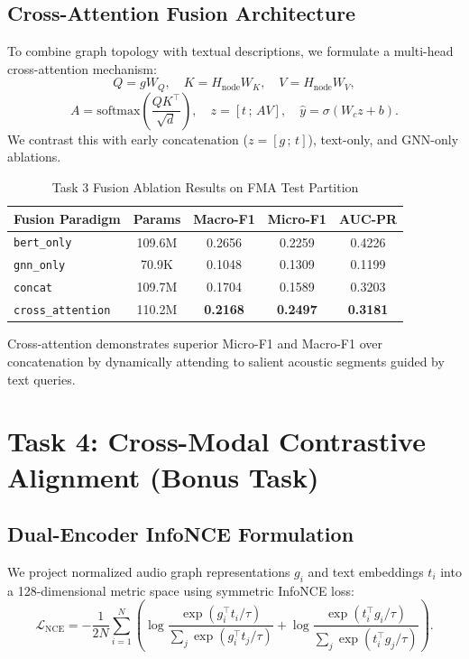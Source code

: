 \documentclass[conference]{IEEEtran}
\begin{document}
\subsection{Cross-Attention Fusion Architecture}
To combine graph topology with textual descriptions, we formulate a multi-head cross-attention mechanism:
$$Q = g W_Q, \quad K = H_{\text{node}} W_K, \quad V = H_{\text{node}} W_V,$$
$$A = \text{softmax}\left(\frac{Q K^\top}{\sqrt{d}}\right), \quad z = [t \,;\, A V], \quad \hat{y} = \sigma(W_c z + b).$$
We contrast this with early concatenation ($z = [g \,;\, t]$), text-only, and GNN-only ablations.

\begin{table}[htbp]
\caption{Task 3 Fusion Ablation Results on FMA Test Partition}
\begin{center}
\begin{tabular}{lcccc}
\toprule
\textbf{Fusion Paradigm} & \textbf{Params} & \textbf{Macro-F1} & \textbf{Micro-F1} & \textbf{AUC-PR} \\
\midrule
\texttt{bert\_only} & 109.6M & 0.2656 & 0.2259 & 0.4226 \\
\texttt{gnn\_only} & 70.9K & 0.1048 & 0.1309 & 0.1199 \\
\texttt{concat} & 109.7M & 0.1704 & 0.1589 & 0.3203 \\
\texttt{cross\_attention} & 110.2M & \textbf{0.2168} & \textbf{0.2497} & \textbf{0.3181} \\
\bottomrule
\end{tabular}
\label{tab:fusion}
\end{center}
\end{table}

Cross-attention demonstrates superior Micro-F1 and Macro-F1 over concatenation by dynamically attending to salient acoustic segments guided by text queries.

\section{Task 4: Cross-Modal Contrastive Alignment (Bonus Task)}
\subsection{Dual-Encoder InfoNCE Formulation}
We project normalized audio graph representations $g_i$ and text embeddings $t_i$ into a 128-dimensional metric space using symmetric InfoNCE loss:
$$\mathcal{L}_{\text{NCE}} = -\frac{1}{2N}\sum_{i=1}^N \left( \log \frac{\exp(g_i^\top t_i / \tau)}{\sum_j \exp(g_i^\top t_j / \tau)} + \log \frac{\exp(t_i^\top g_i / \tau)}{\sum_j \exp(t_i^\top g_j / \tau)} \right).$$
\end{document}

